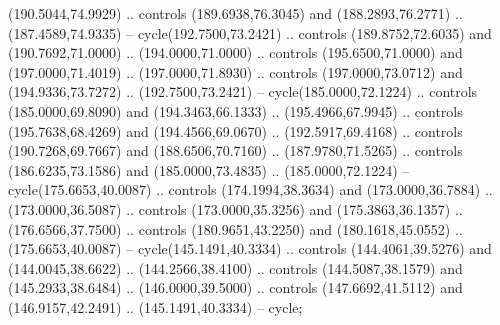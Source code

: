   (190.5044,74.9929) .. controls (189.6938,76.3045) and (188.2893,76.2771) ..
  (187.4589,74.9335) -- cycle(192.7500,73.2421) .. controls (189.8752,72.6035)
  and (190.7692,71.0000) .. (194.0000,71.0000) .. controls (195.6500,71.0000)
  and (197.0000,71.4019) .. (197.0000,71.8930) .. controls (197.0000,73.0712)
  and (194.9336,73.7272) .. (192.7500,73.2421) -- cycle(185.0000,72.1224) ..
  controls (185.0000,69.8090) and (194.3463,66.1333) .. (195.4966,67.9945) ..
  controls (195.7638,68.4269) and (194.4566,69.0670) .. (192.5917,69.4168) ..
  controls (190.7268,69.7667) and (188.6506,70.7160) .. (187.9780,71.5265) ..
  controls (186.6235,73.1586) and (185.0000,73.4835) .. (185.0000,72.1224) --
  cycle(175.6653,40.0087) .. controls (174.1994,38.3634) and (173.0000,36.7884)
  .. (173.0000,36.5087) .. controls (173.0000,35.3256) and (175.3863,36.1357) ..
  (176.6566,37.7500) .. controls (180.9651,43.2250) and (180.1618,45.0552) ..
  (175.6653,40.0087) -- cycle(145.1491,40.3334) .. controls (144.4061,39.5276)
  and (144.0045,38.6622) .. (144.2566,38.4100) .. controls (144.5087,38.1579)
  and (145.2933,38.6484) .. (146.0000,39.5000) .. controls (147.6692,41.5112)
  and (146.9157,42.2491) .. (145.1491,40.3334) -- cycle;

